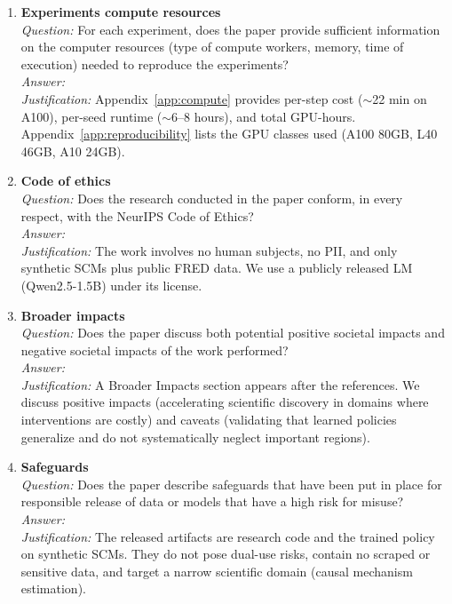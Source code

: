 \begin{enumerate}
\item \textbf{Experiments compute resources}\\
\emph{Question:} For each experiment, does the paper provide sufficient information on the computer resources (type of compute workers, memory, time of execution) needed to reproduce the experiments?\\
\emph{Answer:} \answerYes{}\\
\emph{Justification:} Appendix~\ref{app:compute} provides per-step cost ($\sim$22 min on A100), per-seed runtime ($\sim$6--8 hours), and total GPU-hours. Appendix~\ref{app:reproducibility} lists the GPU classes used (A100 80GB, L40 46GB, A10 24GB).

\item \textbf{Code of ethics}\\
\emph{Question:} Does the research conducted in the paper conform, in every respect, with the NeurIPS Code of Ethics?\\
\emph{Answer:} \answerYes{}\\
\emph{Justification:} The work involves no human subjects, no PII, and only synthetic SCMs plus public FRED data. We use a publicly released LM (Qwen2.5-1.5B) under its license.

\item \textbf{Broader impacts}\\
\emph{Question:} Does the paper discuss both potential positive societal impacts and negative societal impacts of the work performed?\\
\emph{Answer:} \answerYes{}\\
\emph{Justification:} A Broader Impacts section appears after the references. We discuss positive impacts (accelerating scientific discovery in domains where interventions are costly) and caveats (validating that learned policies generalize and do not systematically neglect important regions).

\item \textbf{Safeguards}\\
\emph{Question:} Does the paper describe safeguards that have been put in place for responsible release of data or models that have a high risk for misuse?\\
\emph{Answer:} \answerNA{}\\
\emph{Justification:} The released artifacts are research code and the trained policy on synthetic SCMs. They do not pose dual-use risks, contain no scraped or sensitive data, and target a narrow scientific domain (causal mechanism estimation).


\end{enumerate}
